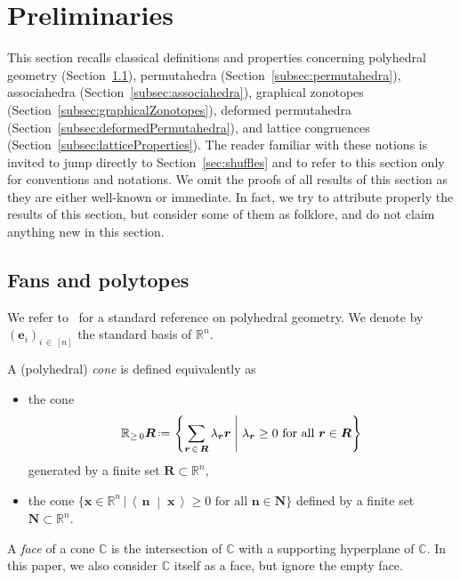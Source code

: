 \documentclass[AHL,Unicode,longabstracts,published]{cedram}
\newcommand{\R}{\mathbb{R}}
\renewcommand{\b}[1]{\boldsymbol{#1}}
\newcommand{\set}[2]{\left\{ #1 \;\middle|\; #2 \right\}}
\newcommand{\dotprod}[2]{\left\langle \, #1 \; \middle| \; #2 \, \right\rangle}
\newcommand{\eqdef}{\mbox{\,\raisebox{0.2ex}{\scriptsize\ensuremath{\mathrm:}}\ensuremath{=}\,}}
\newcommand{\polytope}[1]{\mathds{#1}}
\begin{document}
\section{Preliminaries}\label{sec:preliminaries}

This section recalls classical definitions and properties concerning polyhedral geometry (Section~\ref{subsec:fansPolytopes}), permutahedra (Section~\ref{subsec:permutahedra}), associahedra (Section~\ref{subsec:associahedra}), graphical zonotopes (Section~\ref{subsec:graphicalZonotopes}), deformed permutahedra (Section~\ref{subsec:deformedPermutahedra}), and lattice congruences (Section~\ref{subsec:latticeProperties}). The reader familiar with these notions is invited to jump directly to Section~\ref{sec:shuffles} and to refer to this section only for conventions and notations. We omit the proofs of all results of this section as they are either well-known or immediate. In fact, we try to attribute properly the results of this section, but consider some of them as folklore, and do not claim anything new in this section.



\subsection{Fans and polytopes}\label{subsec:fansPolytopes}

We refer to~\cite{Ziegler-polytopes} for a standard reference on polyhedral geometry. We denote by~$(\b{e}_i)_{i\,\in\,[n]}$ the standard basis of $\R^n$.

\begin{defi}\label{def:cone}
A (polyhedral)
\emph{cone} is defined equivalently as
\begin{itemize}
\item the cone
\[
\R_{\ge\,0} \b{R} \eqdef \set{\sum_{\b{r}\,\in \,\b{R}}\lambda_{\b{r}} \b{r}}{\lambda_{\b{r}} \ge 0 \text{ for all } \b{r} \in \b{R}}
\]
generated by a finite set $\b{R} \subset \R^n$,
\item the cone $\{\b{x} \!\in\! \R^n\,|\,\dotprod{\b{n}}{\b{x}} \ge 0 \text{ for all } \b{n} \!\in\! \b{N}\}$ defined by a finite set ${\b{N} \!\subset\! \R^n}$.
\end{itemize}
A
\emph{face} of a cone $\polytope{C}$ is the intersection of $\polytope{C}$ with a supporting hyperplane of $\polytope{C}$. In this paper, we also consider $\polytope{C}$ itself as a face, but ignore the empty face.
\end{defi}
\end{document}
